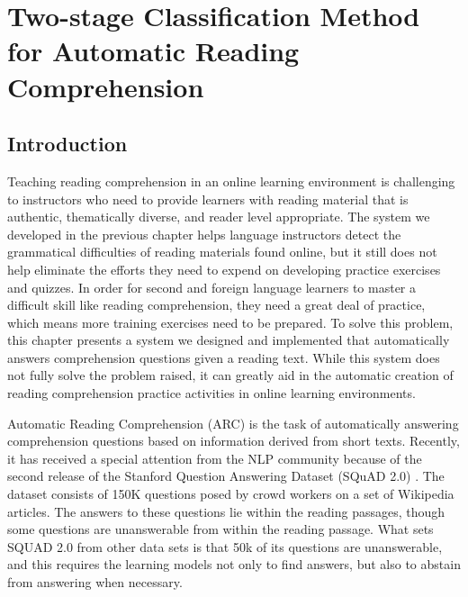 
\chapter{Two-stage Classification Method for Automatic Reading Comprehension } %

\label{Chapter3} %

\section{Introduction}

Teaching reading comprehension in an online learning environment is challenging to instructors who need to provide learners with reading material that is authentic, thematically diverse, and reader level appropriate. The system we developed in the previous chapter helps language instructors detect the grammatical difficulties of reading materials found online, but it still does not help eliminate the efforts they need to expend on developing practice exercises and quizzes. In order for second and foreign language learners to master a difficult skill like reading comprehension, they need a great deal of practice, which means more training exercises need to be prepared. To solve this problem,  this chapter presents a system we designed and implemented that automatically answers comprehension questions given a reading text. While this system does not fully solve the problem raised, it can greatly aid in the automatic creation of reading comprehension practice activities in online learning environments.

Automatic Reading Comprehension (ARC) is the task of automatically answering comprehension questions based on information derived from short texts. Recently, it has received a special attention from the NLP community because of the second release of the Stanford Question Answering Dataset (SQuAD 2.0) \citep{rajpurkar2018know}. The dataset consists of 150K questions posed by crowd workers on a set of Wikipedia articles. The answers to these questions lie within the reading passages, though some questions are unanswerable from within the reading passage. What sets SQUAD 2.0 from other data sets is that 50k of its questions are unanswerable, and this requires the learning models not only to find answers, but also to abstain from answering when necessary. \\

